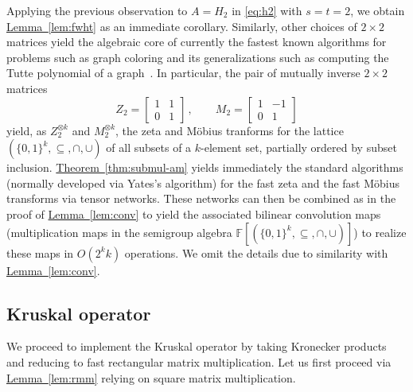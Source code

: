 \documentclass[11pt]{article}
\numberwithin{equation}{section}
\theoremstyle{definition}
\theoremstyle{plain}
\newcommand{\expref}[2]{\hyperref[#2]{#1~\ref{#2}}}
\newcommand{\F}{\ensuremath{\mathbb{F}}}
\begin{document}
Applying the previous observation to $A=H_2$ in \eqref{eq:h2} with $s=t=2$,
we obtain \expref{Lemma}{lem:fwht} as an immediate corollary. Similarly,
other choices of $2\times 2$ matrices yield the algebraic core of currently
the fastest known algorithms for problems such as graph coloring
and its generalizations such as computing the Tutte polynomial of
a graph~\cite{BjorklundHKK2007,BjorklundHKK2008,BjorklundHK2009}.
In particular, the pair of mutually inverse $2\times 2$ matrices
\[
Z_2=\left[\begin{array}{rr}
1&1\\
0&1
\end{array}\right]\,,\qquad
M_2=\left[\begin{array}{rr}
1&-1\\
0&1
\end{array}\right]
\]
yield, as $Z_2^{\otimes k}$ and $M_2^{\otimes k}$, the zeta and
M\"obius tranforms for the lattice $(\{0,1\}^k,\subseteq,\cap,\cup)$
of all subsets of a $k$-element set, partially ordered by subset inclusion.
\expref{Theorem}{thm:submul-am} yields immediately the standard algorithms
(normally developed via Yates's algorithm)
for the fast zeta and the fast M\"obius transforms via tensor networks.
These networks can then be combined as in the proof of
\expref{Lemma}{lem:conv} to yield the associated bilinear convolution maps
(multiplication maps in the semigroup algebra
$\F[(\{0,1\}^k,\subseteq,\cap,\cup)]$) to realize these maps in
$O(2^kk)$ operations. We omit the details due to similarity
with \expref{Lemma}{lem:conv}.



\subsection{Kruskal operator}

We proceed to implement the Kruskal operator by taking Kronecker products
and reducing to fast rectangular matrix multiplication. Let us first
proceed via \expref{Lemma}{lem:rmm} relying on square matrix multiplication.
\end{document}
